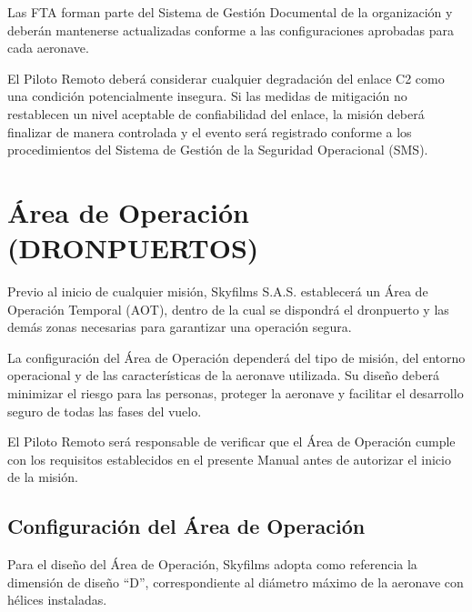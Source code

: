 Las FTA forman parte del Sistema de Gestión Documental de la organización y deberán mantenerse actualizadas conforme a las configuraciones aprobadas para cada aeronave.

\begin{tcolorbox}[
title=Nota Operacional,
colback=blue!5,
colframe=blue!60!black]

El Piloto Remoto deberá considerar cualquier degradación del enlace C2 como una condición potencialmente insegura. Si las medidas de mitigación no restablecen un nivel aceptable de confiabilidad del enlace, la misión deberá finalizar de manera controlada y el evento será registrado conforme a los procedimientos del Sistema de Gestión de la Seguridad Operacional (SMS).

\end{tcolorbox}










\section{Área de Operación (DRONPUERTOS)
}

Previo al inicio de cualquier misión, Skyfilms S.A.S. establecerá un Área de Operación Temporal (AOT), dentro de la cual se dispondrá el dronpuerto y las demás zonas necesarias para garantizar una operación segura.

La configuración del Área de Operación dependerá del tipo de misión, del entorno operacional y de las características de la aeronave utilizada. Su diseño deberá minimizar el riesgo para las personas, proteger la aeronave y facilitar el desarrollo seguro de todas las fases del vuelo.

El Piloto Remoto será responsable de verificar que el Área de Operación cumple con los requisitos establecidos en el presente Manual antes de autorizar el inicio de la misión.

\subsection{Configuración del Área de Operación}

Para el diseño del Área de Operación, Skyfilms adopta como referencia la dimensión de diseño ``D'', correspondiente al diámetro máximo de la aeronave con hélices instaladas.

